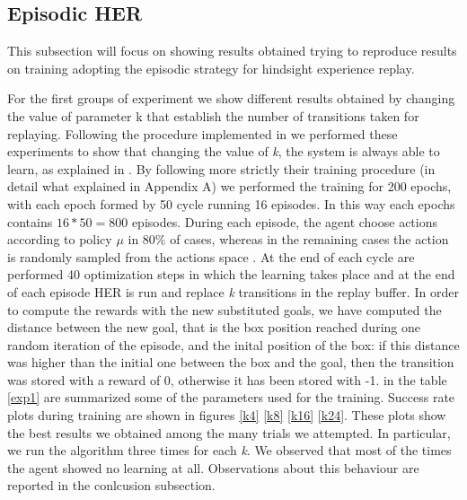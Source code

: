 \documentclass[a4paper]{report}
\begin{document}
\subsection{Episodic HER }
This subsection will focus on showing results obtained trying to reproduce \cite{her} results on training adopting the episodic strategy for hindsight experience replay. 

For the first groups of experiment we show different results obtained by changing the value of parameter k that establish the number of transitions taken for replaying. Following the procedure implemented in \cite{her} we performed these experiments to show that changing the value of \textit{k}, the system is always able to learn, as explained in \cite{her}. By following more strictly their training procedure (in detail what explained in Appendix A) we performed the training for 200 epochs, with each epoch formed by 50 cycle running 16 episodes. In this way each epochs contains $16 * 50=800$ episodes. During each episode, the agent choose actions according to policy $ \mu $ in 
$ 80 \%  $ of cases, whereas in the remaining cases the action is randomly sampled from the actions space . At the end of each cycle are performed 40 optimization steps in which the learning takes place and at the end of each episode HER is run and replace 	\textit{k} transitions in the replay buffer. In order to compute the rewards with the new substituted goals, we have computed the distance between the new goal, that is the box position reached during one random iteration of the episode, and the inital position of the box: if this distance was higher than the initial one between the box and the goal, then the transition was stored with a reward of $0$, otherwise it has been stored with -1. in the table \ref{exp1} are summarized some of the parameters used for the training. 
Success rate plots during training are shown in figures \ref{k4} \ref{k8} \ref{k16} \ref{k24}.  These plots show the best results we obtained among the many trials we attempted. In particular, we run the algorithm three times for each \textit{k}. We observed that most of the times the agent showed no learning at all. Observations about this behaviour are reported in the conlcusion subsection.
\end{document}
